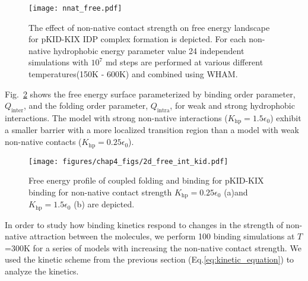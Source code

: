 \documentclass[../talant.diss.submit.tex]{subfiles}
\begin{document}
%
%        
\begin{figure}[h!]
  \begin{centering}
    \texttt{[image: nnat\_free.pdf]}
    \caption{The effect of non-native contact strength on free energy landscape
      for pKID-KIX IDP complex formation is depicted. For each non-native hydrophobic
      energy parameter value 24 independent simulations with $10^7$ md steps are
      performed at various different temperatures(150K - 600K) and combined using WHAM.}                
    \label{fig:nnat_free}                                                                                  
  \end{centering}                                                                                          
\end{figure}
%
%

Fig.~\ref{fig:int_kid} shows the free energy surface parameterized by binding order parameter, $Q_\mathrm{inter}$, and the folding order parameter,  $Q_\mathrm{intra}$, for weak and strong hydrophobic interactions. 
The model with strong non-native interactions ($K_{\mathrm{hp}} =1.5 \epsilon_0$) exhibit a
smaller barrier with a more localized transition region than a model with 
weak non-native contacts ($K_{\mathrm{hp}} = 0.25 \epsilon_0$).

%
%
\begin{figure}[htp!]
  \centering
  \texttt{[image: figures/chap4\_figs/2d\_free\_int\_kid.pdf]}
  \caption{Free energy profile of coupled folding and binding for pKID-KIX binding
    for non-native contact strength $K_{\mathrm{hp}} = 0.25\epsilon_{0}$
    (a)and $K_{\mathrm{hp}} = 1.5 \epsilon_0$ (b) are depicted.}
  \label{fig:int_kid}
\end{figure}
%
%

In order to study how binding kinetics respond to changes in the strength of non-native attraction
between the molecules,
we perform 100 binding simulations at $T$=300K for a series of models with
increasing the non-native contact strength. We used the kinetic scheme from the
previous section (Eq.\ref{eq:kinetic_equation}) to analyze the kinetics.
\end{document}

